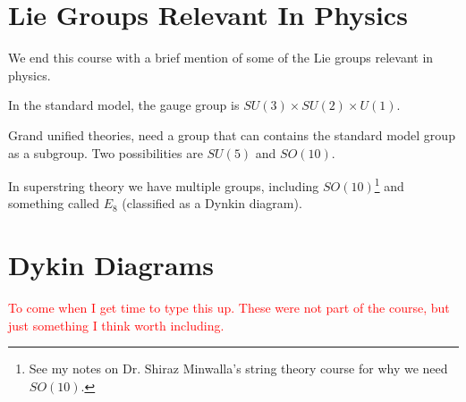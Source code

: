 \section{Lie Groups Relevant In Physics}

We end this course with a brief mention of some of the Lie groups relevant in physics.
\ben[label=(\roman*)]
    \item In the standard model, the gauge group is $SU(3)\times SU(2)\times U(1)$. 
    \item Grand unified theories, need a group that can contains the standard model group as a subgroup. Two possibilities are $SU(5)$ and $SO(10)$.
    \item In superstring theory we have multiple groups, including $SO(10)$\footnote{See my notes on Dr. Shiraz Minwalla's string theory course for why we need $SO(10)$.} and something called $E_8$ (classified as a Dynkin diagram).
\een 

\section{Dykin Diagrams}

\textcolor{red}{To come when I get time to type this up. These were not part of the course, but just something I think worth including.}
